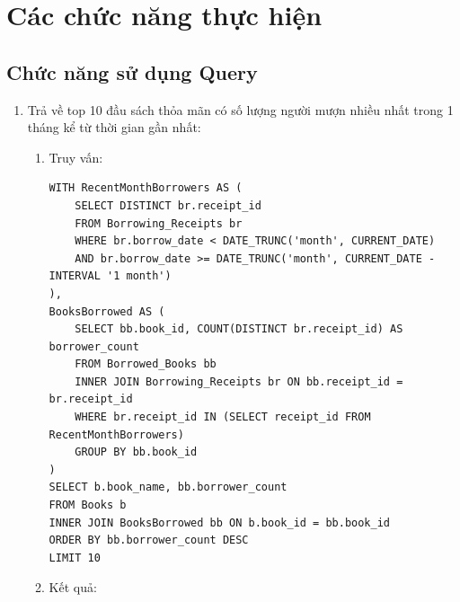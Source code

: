 \documentclass[12pt]{article}
\begin{document}
\section{Các chức năng thực hiện}
\subsection{Chức năng sử dụng Query}
\begin{enumerate}
    \item Trả về top 10 đầu sách thỏa mãn có số lượng người mượn nhiều nhất trong 1 tháng kể từ thời gian gần nhất:
    \begin{enumerate}
        \item Truy vấn:
        \begin{lstlisting}
WITH RecentMonthBorrowers AS (
    SELECT DISTINCT br.receipt_id
    FROM Borrowing_Receipts br
    WHERE br.borrow_date < DATE_TRUNC('month', CURRENT_DATE)
    AND br.borrow_date >= DATE_TRUNC('month', CURRENT_DATE - INTERVAL '1 month')
),
BooksBorrowed AS (
    SELECT bb.book_id, COUNT(DISTINCT br.receipt_id) AS borrower_count
    FROM Borrowed_Books bb
    INNER JOIN Borrowing_Receipts br ON bb.receipt_id = br.receipt_id
    WHERE br.receipt_id IN (SELECT receipt_id FROM RecentMonthBorrowers)
    GROUP BY bb.book_id
)
SELECT b.book_name, bb.borrower_count
FROM Books b
INNER JOIN BooksBorrowed bb ON b.book_id = bb.book_id
ORDER BY bb.borrower_count DESC
LIMIT 10

        \end{lstlisting}
        \item Kết quả:
        

\end{enumerate}
\end{enumerate}
\end{document}
